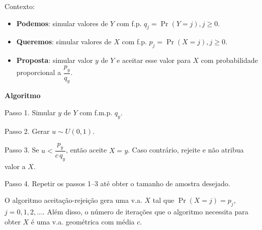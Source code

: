 \documentclass[
  letterpaper,
  DIV=11,
  numbers=noendperiod]{scrreprt}
\providecommand{\tightlist}{%
  \setlength{\itemsep}{0pt}\setlength{\parskip}{0pt}}\usepackage{longtable,booktabs,array}
\begin{document}
Contexto:

\begin{itemize}
\tightlist
\item
  \textbf{Podemos}: simular valores de \(Y\) com f.p.
  \(q_j=\Pr(Y=j), j\geq 0\).
\item
  \textbf{Queremos}: simular valores de \(X\) com f.p.
  \small  \(p_j=\Pr(X=j), j\geq 0\).
\item
  \textbf{Proposta}: simular valor \(y\) de \(Y\) e aceitar esse valor
  para \(X\) com probabilidade proporcional a \(\dfrac{p_y}{q_y}\).
\end{itemize}

\begin{tcolorbox}[enhanced jigsaw, left=2mm, rightrule=.15mm, toprule=.15mm, opacityback=0, leftrule=.75mm, colframe=quarto-callout-warning-color-frame, colback=white, breakable, arc=.35mm, bottomrule=.15mm]

\vspace{-3mm}\textbf{Algoritmo}\vspace{3mm}

Passo 1. Simular \(y\) de \(Y\) com f.m.p. \(q_y\).

Passo 2. Gerar \(u \sim U(0,1)\).

Passo 3. Se \(u < \dfrac{p_y}{c \, q_y}\), então aceite \(X = y\). Caso
contrário, rejeite e não atribua valor a \(X\).

Passo 4. Repetir os passos 1--3 até obter o tamanho de amostra desejado.

\end{tcolorbox}

O algoritmo aceitação-rejeição gera uma v.a. \(X\) tal que
\(\Pr(X=j)=p_j\), \(j=0,1,2,\ldots\). Além disso, o número de iterações
que o algoritmo necessita para obter \(X\) é uma v.a. geométrica com
média \(c\).
\end{document}
